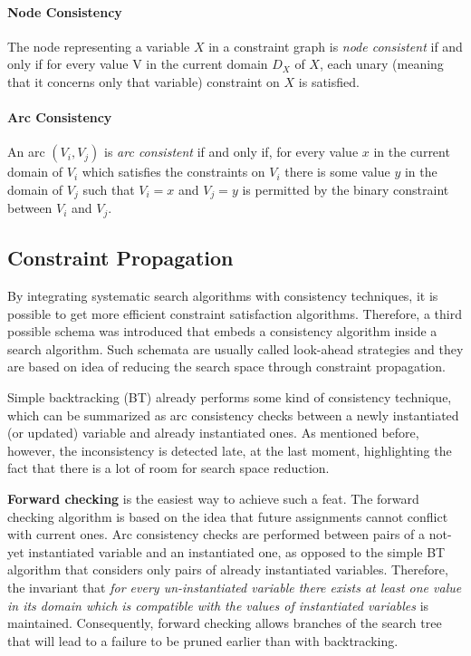 \paragraph{Node Consistency} The node representing a variable $X$ in a constraint graph is \textit{node consistent} if and only if for every value V in the current domain $D_X$ of $X$, each unary (meaning that it concerns only that variable) constraint on $X$ is satisfied.

\paragraph{Arc Consistency} An arc $(V_i, V_j)$ is \textit{arc consistent} if and only if, for every value $x$ in the current domain of $V_i$ which satisfies the constraints on $V_i$ there is some value $y$ in the domain of $V_j$ such that $V_i = x$ and $V_j = y$ is permitted by the binary constraint between $V_i$ and $V_j$.

\subsection{Constraint Propagation}

By integrating systematic search algorithms with consistency techniques, it is possible to get more efficient constraint satisfaction algorithms. 
Therefore, a third possible schema was introduced that embeds a consistency algorithm inside a search algorithm. Such schemata are usually called look-ahead strategies and they are based on idea of reducing the search space through constraint propagation.
\par
Simple backtracking (BT) already performs some kind of consistency technique, which can be summarized as arc consistency checks between a newly instantiated (or updated) variable and already instantiated ones. As mentioned before, however, the inconsistency is detected late, at the last moment, highlighting the fact that there is a lot of room for search space reduction.
\par
\textbf{Forward checking} is the easiest way to achieve such a feat. The forward checking algorithm is based on the idea that future assignments cannot conflict with current ones. 
Arc consistency checks are performed between pairs of a not-yet instantiated variable and an instantiated one, as opposed to the simple BT algorithm that considers only pairs of already instantiated variables. Therefore, the invariant that \textit{for every un-instantiated variable there exists at least one value in its domain which is compatible with the values of instantiated variables} is maintained. Consequently, forward checking allows branches of the search tree that will lead to a failure to be pruned earlier than with backtracking.

